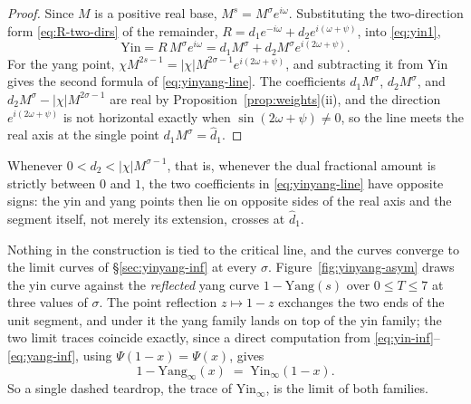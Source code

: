 \documentclass[11pt]{article}
\theoremstyle{definition}
\begin{document}
\begin{proof}
Since $M$ is a positive real base, $M^{s}=M^{\sigma}e^{i\omega}$.
Substituting the two-direction form \eqref{eq:R-two-dirs} of the
remainder, $R=d_1e^{-i\omega}+d_2e^{i(\omega+\psi)}$, into
\eqref{eq:yin1},
\[
\mathrm{Yin}
=R\,M^{\sigma}e^{i\omega}
=d_1M^{\sigma}+d_2M^{\sigma}e^{i(2\omega+\psi)}.
\]
For the yang point, $\chi M^{2s-1}=|\chi|M^{2\sigma-1}e^{i(2\omega+\psi)}$,
and subtracting it from $\mathrm{Yin}$ gives the second formula of
\eqref{eq:yinyang-line}. The coefficients $d_1M^{\sigma}$,
$d_2M^{\sigma}$, and $d_2M^{\sigma}-|\chi|M^{2\sigma-1}$ are real by
Proposition~\ref{prop:weights}(ii), and the direction
$e^{i(2\omega+\psi)}$ is not horizontal exactly when
$\sin(2\omega+\psi)\neq0$, so the line meets the real axis at the single
point $d_1M^{\sigma}=\hat d_1$.
\end{proof}

Whenever $0<d_2<|\chi|M^{\sigma-1}$, that is, whenever the dual
fractional amount is strictly between $0$ and $1$, the two coefficients
in \eqref{eq:yinyang-line} have opposite signs: the yin and yang points
then lie on opposite sides of the real axis and the segment itself, not
merely its extension, crosses at $\hat d_1$.

Nothing in the construction is tied to the critical line, and the curves
converge to the limit curves of \S\ref{sec:yinyang-inf} at every $\sigma$.
Figure~\ref{fig:yinyang-asym} draws the yin curve against the
\emph{reflected} yang curve $1-\mathrm{Yang}(s)$ over $0\leq T\leq7$ at
three values of $\sigma$. The point reflection $z\mapsto1-z$ exchanges
the two ends of the unit segment, and under it the yang family lands on
top of the yin family; the two limit traces coincide exactly, since a
direct computation from \eqref{eq:yin-inf}--\eqref{eq:yang-inf}, using
$\Psi(1-x)=\Psi(x)$, gives
\begin{equation}\label{eq:refl-yang}
1-\mathrm{Yang}_{\infty}(x)\;=\;\mathrm{Yin}_{\infty}(1-x).
\end{equation}
So a single dashed teardrop, the trace of $\mathrm{Yin}_{\infty}$,
is the limit of both families.
\end{document}
